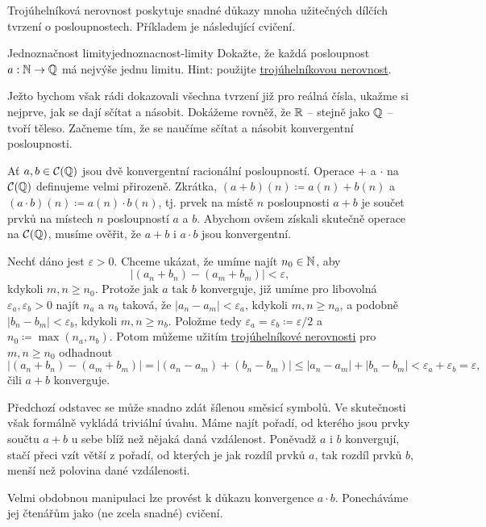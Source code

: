 Trojúhelníková nerovnost poskytuje snadné důkazy mnoha užitečných dílčích
tvrzení o posloupnostech. Příkladem je následující cvičení.

\begin{exercise}{Jednoznačnost limity}{jednoznacnost-limity}
 Dokažte, že každá posloupnost $a:\mathbb{N} \to \mathbb{Q}$ má nejvýše jednu limitu. Hint:
 použijte \hyperref[lem:trojuhelnikova-nerovnost]{trojúhelníkovou nerovnost}.
\end{exercise}

Ježto bychom však rádi dokazovali všechna tvrzení již pro reálná čísla, ukažme
si nejprve, jak se dají sčítat a násobit. Dokážeme rovněž, že $\mathbb{R}$ -- stejně
jako $\mathbb{Q}$ -- tvoří těleso. Začneme tím, že se naučíme sčítat a násobit
konvergentní posloupnosti.

Ať $a,b \in \mathcal{C}(\mathbb{Q})$ jsou dvě konvergentní racionální posloupností.
Operace $+$ a $ \cdot $ na $\mathcal{C}(\mathbb{Q})$ definujeme velmi přirozeně.
Zkrátka, $(a+b)(n) \coloneqq a(n) + b(n)$ a $(a \cdot b)(n) \coloneqq a(n) \cdot
b(n)$, tj. prvek na místě $n$ posloupnosti $a+b$ je součet prvků na místech $n$
posloupností $a$ a $b$. Abychom ovšem získali skutečně operace na
$\mathcal{C}(\mathbb{Q})$, musíme ověřit, že $a+b$ i $a \cdot b$ jsou konvergentní.

Nechť dáno jest $\varepsilon>0$. Chceme ukázat, že umíme najít $n_0 \in \mathbb{N}$, aby
\[
 |(a_n + b_n) - (a_m + b_m)| < \varepsilon,
\]
kdykoli $m,n \geq n_0$. Protože jak $a$ tak $b$ konverguje, již umíme pro
libovolná $\varepsilon_a,\varepsilon_b>0$ najít $n_a$ a $n_b$ taková, že $|a_n -
a_m| < \varepsilon_a$, kdykoli $m,n \geq n_a$, a podobně $|b_n -
b_m|<\varepsilon_b$, kdykoli $m,n \geq n_b$. Položme tedy $\varepsilon_a =
\varepsilon_b \coloneqq \varepsilon / 2$ a $n_0 \coloneqq \max(n_a,n_b)$. Potom
můžeme užitím \hyperref[lem:trojuhelnikova-nerovnost]{trojúhelníkové nerovnosti}
pro $m,n \geq n_0$ odhadnout
\[
 |(a_n + b_n) - (a_m + b_m)| = |(a_n - a_m) + (b_n - b_m)| \leq |a_n - a_m| +
 |b_n - b_m| < \varepsilon_a + \varepsilon_b = \varepsilon,
\]
čili $a + b$ konverguje.

Předchozí odstavec se může snadno zdát šílenou směsicí symbolů. Ve skutečnosti
však formálně vykládá triviální úvahu. Máme najít pořadí, od kterého jsou prvky
součtu $a + b$ u sebe blíž než nějaká daná vzdálenost. Poněvadž $a$ i $b$
konvergují, stačí přeci vzít větší z pořadí, od kterých je jak rozdíl prvků $a$,
tak rozdíl prvků $b$, menší než polovina dané vzdálenosti.

Velmi obdobnou manipulaci lze provést k důkazu konvergence $a \cdot b$.
Ponecháváme jej čtenářům jako (ne zcela snadné) cvičení.

